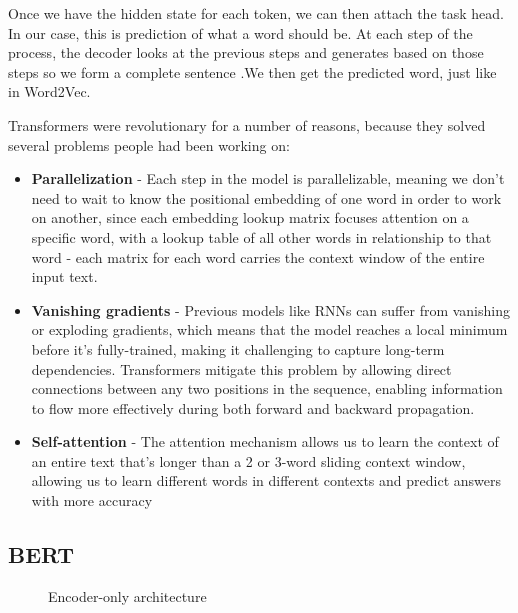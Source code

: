 \documentclass[11pt, table]{diazessay} %
\begin{document}
\begin{sloppypar}
Once we have the hidden state for each token, we can then attach the task head. In our case, this is prediction of what a word should be.  At each step of the process, the decoder looks at the previous steps and generates based on those steps so we form a complete sentence \citep{rush2018annotated}.We then get the predicted word, just like in Word2Vec.

Transformers were revolutionary for a number of reasons, because they solved several problems people had been working on:
\begin{itemize}
\item\textbf{Parallelization} - Each step in the model is parallelizable, meaning we don't need to wait to know the positional embedding of one word in order to work on another, since each embedding lookup matrix focuses attention on a specific word, with a lookup table of all other words in relationship to that word - each matrix for each word carries the context window of the entire input text.
\item\textbf{Vanishing gradients} - Previous models like RNNs can suffer from vanishing or exploding gradients, which means that the model reaches a local minimum before it's fully-trained, making it challenging to capture long-term dependencies. Transformers mitigate this problem by allowing direct connections between any two positions in the sequence, enabling information to flow more effectively during both forward and backward propagation.
\item\textbf{Self-attention} - The attention mechanism allows us to learn the context of an entire text that's longer than a 2 or 3-word sliding context window, allowing us to learn different words in different contexts and predict answers with more accuracy
\end{itemize}


\subsection{BERT}

\begin{figure}[H]
\caption{Encoder-only architecture}
\end{figure}


\end{sloppypar}
\end{document}
